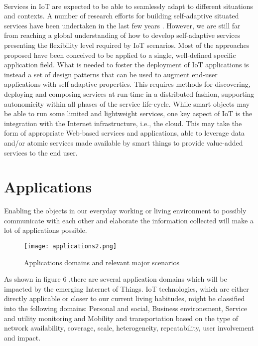 \documentclass[10pt, twocolumn]{article}
\begin{document}
\paragraph{}
Services in IoT are expected to be able to seamlessly adapt to different situations and contexts. A number of research efforts for building self-adaptive situated services have been undertaken in the last few years \cite{ref10}. However, we are still far from reaching a global understanding of how to develop self-adaptive services presenting the flexibility level required by IoT scenarios. Most of the approaches proposed have been conceived to be applied to a single, well-defined specific application field. What is needed to foster the deployment of IoT applications is instead a set of design patterns that can be used to augment end-user applications with self-adaptive properties. This requires methods for discovering, deploying and composing services at run-time in a distributed fashion, supporting autonomicity within all phases of the service life-cycle. While smart objects may be able to run some limited and lightweight services, one key aspect of IoT is the integration with the Internet infrastructure, i.e., the cloud. This may take the form of appropriate Web-based services and applications, able to leverage data and/or atomic services made available by smart things to provide value-added services to the end user.
\section{Applications}
Enabling the objects in our everyday working or living environment to possibly communicate with each other and elaborate
the information collected will make a lot of applications possible.

\begin{figure}
\begin{center}
\texttt{[image: applications2.png]}
\end{center}
\caption{Applications domains and relevant major scenarios}
\end{figure}

As shown in figure 6 ,there are several application domains which will be impacted by the emerging Internet of Things. IoT technologies, which are either directly applicable or closer to our current living habitudes, might be classified into the following domains: Personal and social, Business environement, Service and utility monitoring and Mobility and transportation based on the type of network availability, coverage, scale, heterogeneity, repeatability, user involvement and impact.
\end{document}
